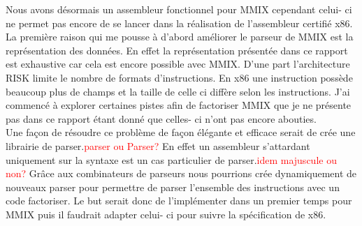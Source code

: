 \documentclass {article}
\theoremstyle{definition}
\theoremstyle{remark}
\newcommand{\todo}[1]{\textcolor{red}{#1}}
\begin{document}
Nous avons désormais un assembleur fonctionnel pour MMIX cependant celui- ci ne permet pas encore de se lancer
dans la réalisation de l'assembleur certifié x86.\\
La première raison qui me pousse à d'abord améliorer le parseur de MMIX est la représentation des données.
En effet la représentation présentée dans ce rapport est exhaustive car cela est encore possible avec
MMIX. D'une part l'architecture RISK limite le nombre de formats d'instructions. En x86 une instruction possède
beaucoup plus de champs et la taille de celle ci diffère selon les instructions. J'ai commencé à explorer certaines
pistes afin de factoriser MMIX que je ne présente pas dans ce rapport étant donné que celles- ci n'ont pas encore abouties.
\\
Une façon de résoudre ce problème de façon élégante et efficace serait de crée une librairie de parser.\todo{parser ou Parser?}
En effet un assembleur s'attardant uniquement sur la syntaxe est un cas particulier de parser.\todo{idem majuscule ou non?}
Grâce aux combinateurs de parseurs nous pourrions crée dynamiquement de nouveaux parser pour
permettre de parser l'ensemble des instructions avec un code factoriser. Le but serait donc de l'implémenter
dans un premier temps pour MMIX puis il faudrait adapter celui- ci pour suivre la spécification de x86.
\end{document}

